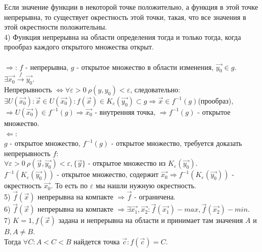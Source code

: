 \documentclass[12pt]{article}
\begin{document}
Если значение функции в некоторой точке положительно, а функция в этой точке непрерывна, то существует окрестность этой точки, такая, что все значения в этой окрестности положительны.\\
4) Функция непрерывна на области определения тогда и только тогда, когда прообраз каждого открытого множества открыт.\\
\\
$\Rightarrow$: $f$ - непрерывна, $g$ - открытое множество в области изменения, $\overrightarrow{y_0} \in g$.\\
$\exists \overrightarrow{x_0} \overset{f}{\rightarrow} \overrightarrow{y_0}$.\\
Непрерывность $\iff \forall \varepsilon > 0 \ \rho (y,y_0)<\varepsilon$, следовательно:\\
$\exists U(\overrightarrow{x_0}) : \overrightarrow{x} \in U(\overrightarrow{x_0}) : f(\overrightarrow{x}) \in K_\varepsilon(\overrightarrow{y_0}) \subset g \Rightarrow \overrightarrow{x} \in f^{-1} (g)$(прообраз), $\Rightarrow U(\overrightarrow{x_0}) \in f^{-1}(g) \Rightarrow \overrightarrow{x_0}$ - внутренняя точка, $\Rightarrow f^{-1}(g)$ - открытое множество.\\
$\Leftarrow$:\\
$g$ - открытое множество, $f^{-1}(g)$ - открытое множество, требуется доказать непрерывность $f$:\\
$\forall \varepsilon > 0 \  \rho(\overrightarrow{y}, \overrightarrow{y_0}) < \varepsilon, \{\overrightarrow{y} \}$ - открытое множество из $K_\varepsilon (\overrightarrow{y_0})$.\\
$f^{-1}(K_\varepsilon(\overrightarrow{y_0}))$ - открытое множество, содержит $\overrightarrow{x_0} \Rightarrow f^{-1}(K_\varepsilon(\overrightarrow{y_0}))$ - окрестность $\overrightarrow{x_0}$. То есть по $\varepsilon$ мы нашли нужную окрестность.\\
5) $\overrightarrow{f}(\overrightarrow{x})$ непрерывна на компакте $\Rightarrow \overrightarrow{f}$ - ограничена.\\
6) $\overrightarrow{f}(\overrightarrow{x})$ непрерывна на компакте $\Rightarrow \exists \overrightarrow{x_1},\overrightarrow{x_2} : \overrightarrow{f}(\overrightarrow{x_1}) - max, \overrightarrow{f}(\overrightarrow{x_2}) - min$.\\
7) $K = 1, f(\overrightarrow{x})$ задана и непрерывна на области и принимает там значения $A$ и $B, A \neq B$.\\
Тогда $\forall C : A<C<B$ найдется точка $\overrightarrow{c} : f(\overrightarrow{c}) = C$.\\
\end{document}
